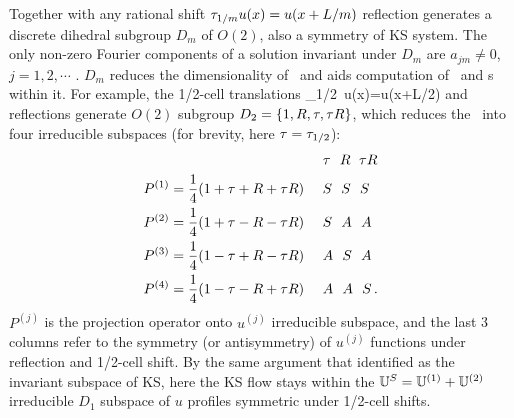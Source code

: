 Together with any rational shift $ \tau_{1/m}u(x)=u(x+L/m)$
reflection generates a discrete dihedral subgroup $D_m$ of $O(2)$, also
a symmetry of KS system. The only non-zero Fourier components of a
solution invariant under $D_m$ are $a_{jm} \neq 0$, $j =1,2,\cdots$ .
$D_m$ reduces the dimensionality of \statesp\ and aids computation of
\eqva\ and \po s within it. For example, the 1/2-cell translations \beq
    \Shift_{1/2}\, u(x)=u(x+L/2)
and reflections generate $O(2)$
subgroup $D_2 = \{1, \Refl,\Shift,\Shift\Refl\}$,
which
reduces the \statesp\ into four irreducible subspaces
(for brevity, here $\Shift = \Shift_{1/2}$):
\begin{align}
 & \qquad\qquad\qquad\qquad\qquad
              ~~~ \Shift ~~ \Refl  ~\;  \Shift\Refl
    \nnu\\
P^{(1)} &= \frac{1}{4} (1 + \Shift + \Refl + \Shift\Refl)
           ~~~~  S  ~~  S   ~~   S
    \nnu\\
P^{(2)} &= \frac{1}{4} (1 + \Shift - \Refl - \Shift\Refl)
            ~~~~  S  ~~  A   ~~   A
    \nnu\\
P^{(3)} &= \frac{1}{4} (1 - \Shift + \Refl - \Shift\Refl)
           ~~~~  A  ~~  S   ~~   A
     \label{ek_defn}\\
P^{(4)} &= \frac{1}{4} (1 - \Shift - \Refl + \Shift\Refl)
          ~~~~  A  ~~  A   ~~   S
\,.
    \nnu
\end{align}
$P^{(j)}$ is the projection operator onto
$u^{(j)}$ irreducible subspace, and the last 3 columns
refer to the symmetry (or antisymmetry) of
$u^{(j)}$ functions under reflection and
1/2-cell shift.
By the same argument that identified  as
the invariant subspace of KS, here the KS flow
stays within the
 $\mathbb{U}^S =  \mathbb{U}^{(1)}+ \mathbb{U}^{(2)}$
irreducible $D_1$ subspace of
$u$ profiles symmetric under 1/2-cell shifts.

